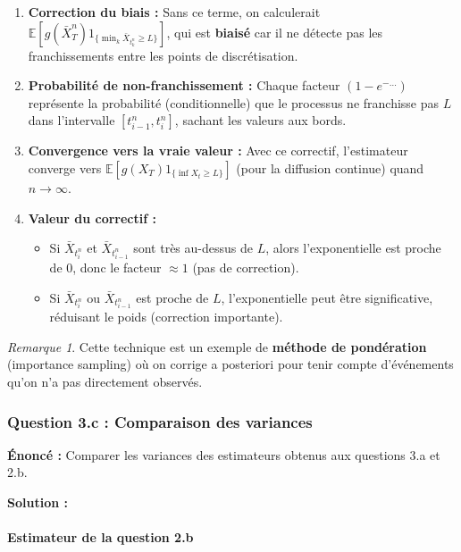 \documentclass[12pt,a4paper]{article}
\theoremstyle{definition}
\theoremstyle{remark}
\newtheorem*{remark}{Remarque}
\newcommand{\E}{\mathbb{E}}
\begin{document}
\begin{enumerate}
\item \textbf{Correction du biais :} Sans ce terme, on calculerait $\E[g(\bar{X}_T^n)1_{\{\min_k \bar{X}_{t_k^n} \geq L\}}]$, qui est \textbf{biaisé} car il ne détecte pas les franchissements entre les points de discrétisation.

\item \textbf{Probabilité de non-franchissement :} Chaque facteur $(1 - e^{-\ldots})$ représente la probabilité (conditionnelle) que le processus ne franchisse pas $L$ dans l'intervalle $[t_{i-1}^n, t_i^n]$, sachant les valeurs aux bords.

\item \textbf{Convergence vers la vraie valeur :} Avec ce correctif, l'estimateur converge vers $\E[g(X_T)1_{\{\inf X_t \geq L\}}]$ (pour la diffusion continue) quand $n \to \infty$.

\item \textbf{Valeur du correctif :} 
\begin{itemize}
\item Si $\bar{X}_{t_i^n}$ et $\bar{X}_{t_{i-1}^n}$ sont très au-dessus de $L$, alors l'exponentielle est proche de $0$, donc le facteur $\approx 1$ (pas de correction).
\item Si $\bar{X}_{t_i^n}$ ou $\bar{X}_{t_{i-1}^n}$ est proche de $L$, l'exponentielle peut être significative, réduisant le poids (correction importante).
\end{itemize}
\end{enumerate}

\begin{remark}
Cette technique est un exemple de \textbf{méthode de pondération} (importance sampling) où on corrige a posteriori pour tenir compte d'événements qu'on n'a pas directement observés.
\end{remark}

\subsubsection{Question 3.c : Comparaison des variances}

\textbf{Énoncé :} Comparer les variances des estimateurs obtenus aux questions 3.a et 2.b.

\textbf{Solution :}

\paragraph{Estimateur de la question 2.b}
\end{document}
